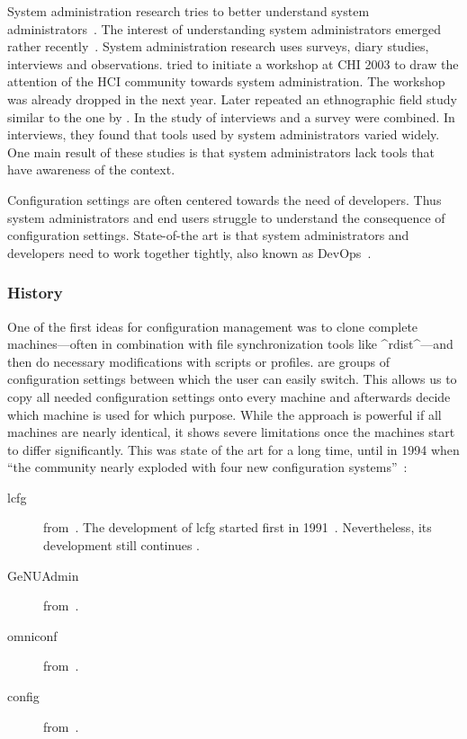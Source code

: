 System administration research tries to better understand system administrators~\cite{zhang2014configuration}.
The interest of understanding system administrators emerged rather recently~\cite{anderson2002researching,barrett2004field}.
System administration research uses surveys, diary studies, interviews and observations.
\citet{barrett2003system} tried to initiate a workshop at CHI 2003 to draw the attention of the HCI community towards system administration.
The workshop was already dropped in the next year.
Later \citet{haber2007design} repeated an ethnographic field study similar to the one by \citet{barrett2004field}.
In the study of \citet{velasquez2008designing} interviews and a survey were combined.
In interviews, they found that tools used by system administrators varied widely.
One main result of these studies is that system administrators lack tools that have awareness of the context.

Configuration settings are often centered towards the need of developers.
Thus system administrators and end users struggle to understand the consequence of configuration settings.
State-of-the art is that system administrators and developers need to work together tightly, also known as DevOps~\cite{roche2013adopting}.


\subsubsection{History}

One of the first ideas for configuration management was to clone complete machines---often in combination with file synchronization tools like ^rdist^---and then do necessary modifications with scripts or profiles.
 are groups of configuration settings between which the user can easily switch.
This allows us to copy all needed configuration settings onto every machine and afterwards decide which machine is used for which purpose.
While the approach is powerful if all machines are nearly identical, it shows severe limitations once the machines start to differ significantly.
This was state of the art for a long time, until in 1994 when \enquote{the community nearly exploded with four new configuration systems}~\cite{evard1997analysis}:

\begin{description}
\item[lcfg] from~\citet{anderson1994towards}.
The development of lcfg started first in 1991~\cite{anderson1991local,anderson1994towards}.
Nevertheless, its development still continues \cite{anderson2002lcfg,hintsch2016review}.
\item[GeNUAdmin] from~\citet{harlander1994central}.
\item[omniconf] from~\citet{hideyo1994omniconf}.
\item[config] from~\citet{rouillard1994config}.
\end{description}

